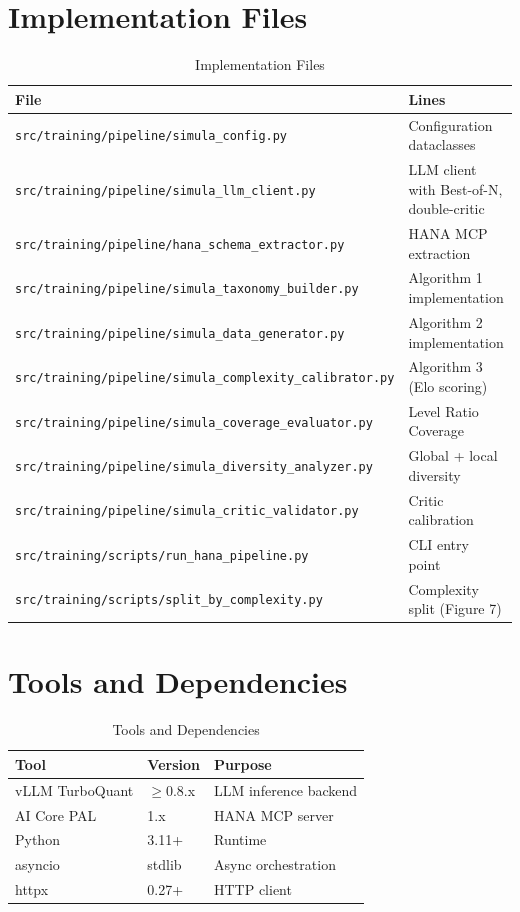 \documentclass[12pt,a4paper,twoside]{report}
\begin{document}
\section{Implementation Files}

\begin{table}[H]
\centering
\caption{Implementation Files}
\begin{tabularx}{\textwidth}{lX}
\toprule
\textbf{File} & \textbf{Lines} \\
\midrule
\texttt{src/training/pipeline/simula\_config.py} & Configuration dataclasses \\
\texttt{src/training/pipeline/simula\_llm\_client.py} & LLM client with Best-of-N, double-critic \\
\texttt{src/training/pipeline/hana\_schema\_extractor.py} & HANA MCP extraction \\
\texttt{src/training/pipeline/simula\_taxonomy\_builder.py} & Algorithm 1 implementation \\
\texttt{src/training/pipeline/simula\_data\_generator.py} & Algorithm 2 implementation \\
\texttt{src/training/pipeline/simula\_complexity\_calibrator.py} & Algorithm 3 (Elo scoring) \\
\texttt{src/training/pipeline/simula\_coverage\_evaluator.py} & Level Ratio Coverage \\
\texttt{src/training/pipeline/simula\_diversity\_analyzer.py} & Global + local diversity \\
\texttt{src/training/pipeline/simula\_critic\_validator.py} & Critic calibration \\
\texttt{src/training/scripts/run\_hana\_pipeline.py} & CLI entry point \\
\texttt{src/training/scripts/split\_by\_complexity.py} & Complexity split (Figure 7) \\
\bottomrule
\end{tabularx}
\end{table}

\section{Tools and Dependencies}

\begin{table}[H]
\centering
\caption{Tools and Dependencies}
\begin{tabular}{lll}
\toprule
\textbf{Tool} & \textbf{Version} & \textbf{Purpose} \\
\midrule
vLLM TurboQuant & $\geq$0.8.x & LLM inference backend \\
AI Core PAL & 1.x & HANA MCP server \\
Python & 3.11+ & Runtime \\
asyncio & stdlib & Async orchestration \\
httpx & 0.27+ & HTTP client \\
\bottomrule
\end{tabular}
\end{table}
\end{document}
